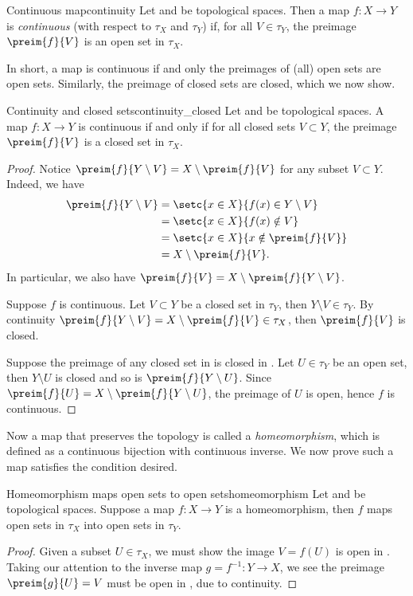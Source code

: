 \begin{definition}{Continuous map}{continuity}
    Let  and  be topological spaces. Then a map \(f : X \to Y\) is \emph{continuous} (with respect to \(\tau_X\) and \(\tau_Y\)) if, for all \(V \in \tau_Y\), the preimage \(\preim{f}{V}\) is an open set in \(\tau_X\).
\end{definition}

In short, a map is continuous if and only the preimages of (all) open sets are open sets. Similarly, the preimage of closed sets are closed, which we now show.
\begin{proposition}{Continuity and closed sets}{continuity_closed}
    Let  and  be topological spaces. A map \(f : X \to Y\) is continuous if and only if for all closed sets \(V \subset Y\), the preimage \(\preim{f}{V}\) is a closed set in \(\tau_X\).
\end{proposition}
\begin{proof}
    Notice \(\preim{f}{Y\setminus V} = X \setminus \preim{f}{V}\) for any subset \(V \subset Y\). Indeed, we have
    \begin{align*}
        \preim{f}{Y \setminus V} &= \setc{x \in X}{f(x) \in Y \setminus V}\\&= \setc{x \in X}{f(x) \notin V}\\&=\setc{x \in X}{x \notin \preim{f}{V}}\\&= X \setminus \preim{f}{V}.
    \end{align*}
    In particular, we also have \(\preim{f}{V} = X \setminus \preim{f}{Y\setminus V}\).

    Suppose \(f\) is continuous. Let \(V \subset Y\) be a closed set in \(\tau_Y\), then \(Y\setminus V \in \tau_Y\). By continuity \(\preim{f}{Y \setminus V} = X \setminus\preim{f}{V} \in \tau_X\), then \(\preim{f}{V}\) is closed.

    Suppose the preimage of any closed set in  is closed in . Let \(U \in \tau_Y\) be an open set, then \(Y\setminus U\) is closed and so is \(\preim{f}{Y\setminus U}\). Since \(\preim{f}{U} = X \setminus \preim{f}{Y\setminus U}\), the preimage of \(U\) is open, hence \(f\) is continuous.
\end{proof}

Now a map that preserves the topology is called a \emph{homeomorphism}, which is defined as a continuous bijection with continuous inverse. We now prove such a map satisfies the condition desired.

\begin{proposition}{Homeomorphism maps open sets to open sets}{homeomorphism}
    Let  and  be topological spaces. Suppose a map \(f : X \to Y\) is a homeomorphism, then \(f\) maps open sets in \(\tau_X\) into open sets in \(\tau_Y\).
\end{proposition}
\begin{proof}
    Given a subset \(U \in \tau_X\), we must show the image \(V = f(U)\) is open in . Taking our attention to the inverse map \(g = f^{-1} : Y \to X\), we see the preimage \(\preim{g}{U} = V\) must be open in , due to continuity.
\end{proof}

